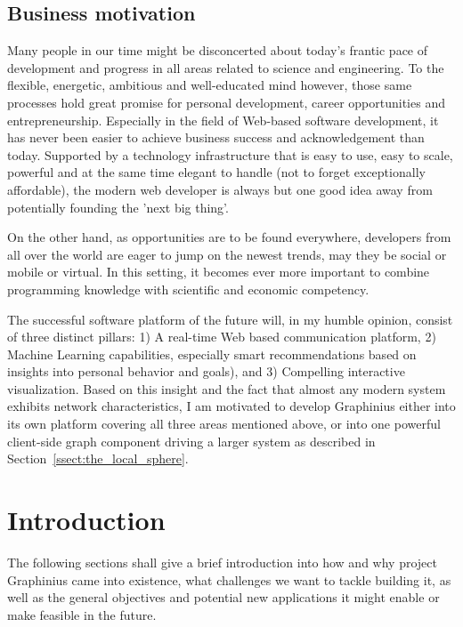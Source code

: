 \section{Business motivation}
\label{sect:business_motivation}

Many people in our time might be disconcerted about today's frantic pace of development and progress in all areas related to science and engineering. To the flexible, energetic, ambitious and well-educated mind however, those same processes hold great promise for personal development, career opportunities and entrepreneurship. Especially in the field of Web-based software development, it has never been easier to achieve business success and acknowledgement than today. Supported by a technology infrastructure that is easy to use, easy to scale, powerful and at the same time elegant to handle (not to forget exceptionally affordable), the modern web developer is always but one good idea away from potentially founding the 'next big thing'.

On the other hand, as opportunities are to be found everywhere, developers from all over the world are eager to jump on the newest trends, may they be social or mobile or virtual. In this setting, it becomes ever more important to combine programming knowledge with scientific and economic competency.

The successful software platform of the future will, in my humble opinion, consist of three distinct pillars: 1) A real-time Web based communication platform, 2) Machine Learning capabilities, especially smart recommendations based on insights into personal behavior and goals), and 3) Compelling interactive visualization. Based on this insight and the fact that almost any modern system exhibits network characteristics, I am motivated to develop Graphinius either into its own platform covering all three areas mentioned above, or into one powerful client-side graph component driving a larger system as described in Section~\ref{ssect:the_local_sphere}.



\chapter{Introduction}
\label{ch:introduction}

The following sections shall give a brief introduction into how and why project Graphinius came into existence, what challenges we want to tackle building it, as well as the general objectives and potential new applications it might enable or make feasible in the future.


